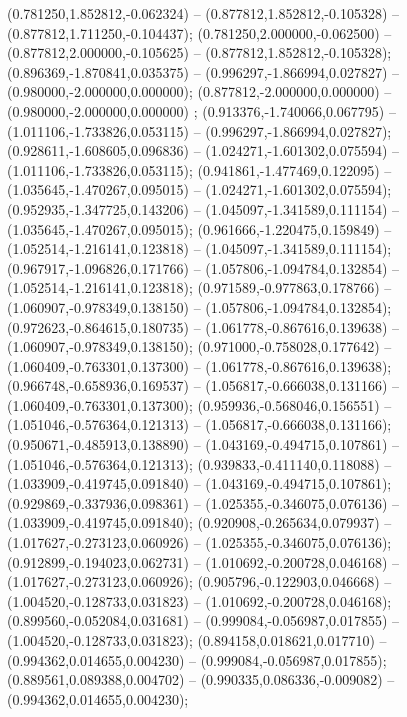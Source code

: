  (0.781250,1.852812,-0.062324) -- (0.877812,1.852812,-0.105328) -- (0.877812,1.711250,-0.104437);
 (0.781250,2.000000,-0.062500) -- (0.877812,2.000000,-0.105625) -- (0.877812,1.852812,-0.105328);
 (0.896369,-1.870841,0.035375) -- (0.996297,-1.866994,0.027827) -- (0.980000,-2.000000,0.000000);
 (0.877812,-2.000000,0.000000) -- (0.980000,-2.000000,0.000000) ;
 (0.913376,-1.740066,0.067795) -- (1.011106,-1.733826,0.053115) -- (0.996297,-1.866994,0.027827);
 (0.928611,-1.608605,0.096836) -- (1.024271,-1.601302,0.075594) -- (1.011106,-1.733826,0.053115);
 (0.941861,-1.477469,0.122095) -- (1.035645,-1.470267,0.095015) -- (1.024271,-1.601302,0.075594);
 (0.952935,-1.347725,0.143206) -- (1.045097,-1.341589,0.111154) -- (1.035645,-1.470267,0.095015);
 (0.961666,-1.220475,0.159849) -- (1.052514,-1.216141,0.123818) -- (1.045097,-1.341589,0.111154);
 (0.967917,-1.096826,0.171766) -- (1.057806,-1.094784,0.132854) -- (1.052514,-1.216141,0.123818);
 (0.971589,-0.977863,0.178766) -- (1.060907,-0.978349,0.138150) -- (1.057806,-1.094784,0.132854);
 (0.972623,-0.864615,0.180735) -- (1.061778,-0.867616,0.139638) -- (1.060907,-0.978349,0.138150);
 (0.971000,-0.758028,0.177642) -- (1.060409,-0.763301,0.137300) -- (1.061778,-0.867616,0.139638);
 (0.966748,-0.658936,0.169537) -- (1.056817,-0.666038,0.131166) -- (1.060409,-0.763301,0.137300);
 (0.959936,-0.568046,0.156551) -- (1.051046,-0.576364,0.121313) -- (1.056817,-0.666038,0.131166);
 (0.950671,-0.485913,0.138890) -- (1.043169,-0.494715,0.107861) -- (1.051046,-0.576364,0.121313);
 (0.939833,-0.411140,0.118088) -- (1.033909,-0.419745,0.091840) -- (1.043169,-0.494715,0.107861);
 (0.929869,-0.337936,0.098361) -- (1.025355,-0.346075,0.076136) -- (1.033909,-0.419745,0.091840);
 (0.920908,-0.265634,0.079937) -- (1.017627,-0.273123,0.060926) -- (1.025355,-0.346075,0.076136);
 (0.912899,-0.194023,0.062731) -- (1.010692,-0.200728,0.046168) -- (1.017627,-0.273123,0.060926);
 (0.905796,-0.122903,0.046668) -- (1.004520,-0.128733,0.031823) -- (1.010692,-0.200728,0.046168);
 (0.899560,-0.052084,0.031681) -- (0.999084,-0.056987,0.017855) -- (1.004520,-0.128733,0.031823);
 (0.894158,0.018621,0.017710) -- (0.994362,0.014655,0.004230) -- (0.999084,-0.056987,0.017855);
 (0.889561,0.089388,0.004702) -- (0.990335,0.086336,-0.009082) -- (0.994362,0.014655,0.004230);
